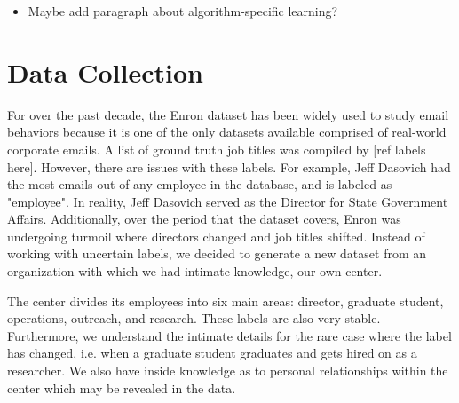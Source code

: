 \documentclass{article}
\begin{document}
\begin{itemize}
\item Maybe add paragraph about algorithm-specific learning?
\end{itemize}

\section{Data Collection} \label{Data Collection}
For over the past decade, the Enron dataset has been widely used to study email behaviors because it is one of the only datasets available comprised of real-world corporate emails.  A list of ground truth job titles was compiled by [ref labels here].  However, there are issues with these labels.  For example, Jeff Dasovich had the most emails out of any employee in the database, and is labeled as "employee".  In reality, Jeff Dasovich served as the Director for State Government Affairs. Additionally, over the period that the dataset covers, Enron was undergoing turmoil where directors changed and job titles shifted.  Instead of working with uncertain labels, we decided to generate a new dataset from an organization with which we had intimate knowledge, our own center.  
\par
The center divides its employees into six main areas: director, graduate student, operations, outreach, and research.  These labels are also very stable.  Furthermore, we understand the intimate details for the rare case where the label has changed, i.e. when a graduate student graduates and gets hired on as a researcher. We also have inside knowledge as to personal relationships within the center which may be revealed in the data.
\end{document}
